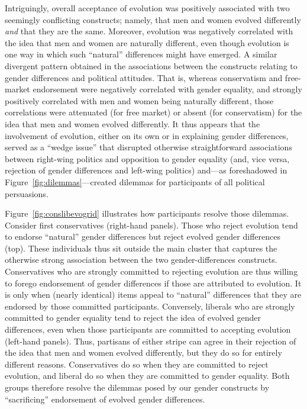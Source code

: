 \documentclass[fignum,man]{apa}\usepackage[]{graphicx}\usepackage[]{color}
\begin{document}
Intriguingly, overall acceptance of evolution was 
positively associated with two seemingly conflicting constructs; 
namely, that men and women evolved differently \textit{and} that they are
the same. Moreover, evolution was negatively correlated with the idea
that men and women are naturally different, even though evolution
is one way in which such ``natural'' differences might have emerged.
A similar divergent pattern obtained in the associations between
the constructs relating to gender differences and political 
attitudes. That is, whereas conservatism and free-market endorsement
were negatively correlated with gender equality, 
and strongly
positively correlated with men and women being naturally different, those
correlations were attenuated (for free market) or absent (for conservatism) 
for the idea that men and women evolved differently.
It thus appears that the involvement of evolution, either on its own or in explaining
gender differences, served as a ``wedge issue'' that disrupted
otherwise straightforward associations between right-wing politics
and opposition to gender equality (and, vice versa, rejection of
gender differences and left-wing politics) and---as foreshadowed
in Figure~\ref{fig:dilemmas}---created 
dilemmas for participants of all political persuasions.

Figure~\ref{fig:conslibevogrid} illustrates
how participants resolve those dilemmas. 
Consider first conservatives (right-hand panels). 
Those who reject evolution tend to endorse ``natural'' gender differences
but reject evolved gender differences (top). These
individuals thus sit outside
the main cluster that captures the
otherwise strong association between the two gender-differences constructs.
Conservatives who are strongly committed to rejecting evolution
are thus willing to forego endorsement of gender differences if 
those are attributed to evolution. It is only when (nearly identical)
items appeal to ``natural'' differences that they are endorsed by 
those committed participants.
Conversely, liberals who are strongly committed to gender equality
tend to reject the idea of evolved gender differences, even
when those participants are committed to accepting evolution (left-hand panels). 
Thus, partisans of either stripe can agree in their rejection of the idea that men and
women evolved differently, but they do so for entirely different
reasons. Conservatives do so when they are committed to reject evolution, and liberal do so when they are committed to gender equality. Both groups therefore resolve the dilemmas
posed by our gender constructs by ``sacrificing'' endorsement of evolved gender
differences.
\end{document}

